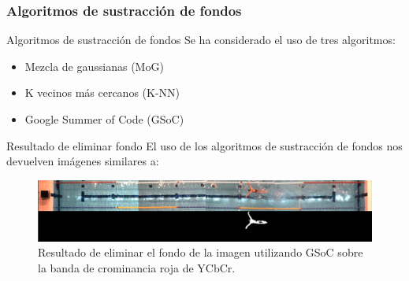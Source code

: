 \documentclass[11pt]{beamer}
\begin{document}
        \subsubsection{Algoritmos de sustracción de fondos} 
        \begin{frame}{Algoritmos de sustracción de fondos}  
            Se ha considerado el uso de tres algoritmos:
            \begin{itemize}
                \item Mezcla de gaussianas (MoG)
                \item K vecinos más cercanos (K-NN)
                \item Google Summer of Code (GSoC)
            \end{itemize}
        \end{frame}
        
        \begin{frame}{Resultado de eliminar fondo}
            El uso de los algoritmos de sustracción de fondos nos devuelven imágenes similares a:
            \begin{figure}
                \centering
                \includegraphics[scale=0.22]{imagenes/ejemplo_eliminar_fondo.png}  
                \caption{Resultado de eliminar el fondo de la imagen utilizando GSoC sobre la banda de crominancia roja de YCbCr.}
                \label{fig:ejemplosustracción}
            \end{figure}
        \end{frame}
        
\end{document}
